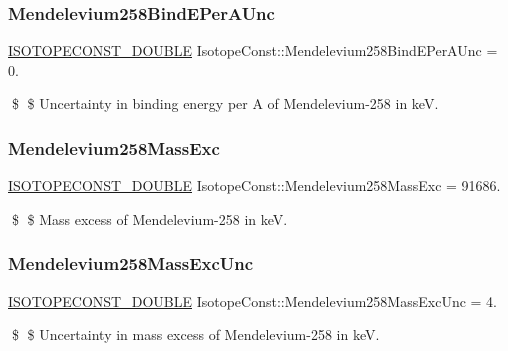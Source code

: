 \subsubsection{\texorpdfstring{Mendelevium258\+Bind\+E\+Per\+A\+Unc}{Mendelevium258BindEPerAUnc}}
{\footnotesize\ttfamily \mbox{\hyperlink{group___isotope_const-_macros_ga8f45a7272ce02c0b4c65c44636ed719a}{I\+S\+O\+T\+O\+P\+E\+C\+O\+N\+S\+T\+\_\+\+D\+O\+U\+B\+LE}} Isotope\+Const\+::\+Mendelevium258\+Bind\+E\+Per\+A\+Unc = 0.}

\$ \$ Uncertainty in binding energy per A of Mendelevium-\/258 in keV. \mbox{\label{group___isotope_const-_mendelevium-_md258_ga3d5959d3ce3120ada207ac061bf05345}} 
\subsubsection{\texorpdfstring{Mendelevium258\+Mass\+Exc}{Mendelevium258MassExc}}
{\footnotesize\ttfamily \mbox{\hyperlink{group___isotope_const-_macros_ga8f45a7272ce02c0b4c65c44636ed719a}{I\+S\+O\+T\+O\+P\+E\+C\+O\+N\+S\+T\+\_\+\+D\+O\+U\+B\+LE}} Isotope\+Const\+::\+Mendelevium258\+Mass\+Exc = 91686.}

\$ \$ Mass excess of Mendelevium-\/258 in keV. \mbox{\label{group___isotope_const-_mendelevium-_md258_ga4b67fa20a17feae10a77136f05ef73a9}} 
\subsubsection{\texorpdfstring{Mendelevium258\+Mass\+Exc\+Unc}{Mendelevium258MassExcUnc}}
{\footnotesize\ttfamily \mbox{\hyperlink{group___isotope_const-_macros_ga8f45a7272ce02c0b4c65c44636ed719a}{I\+S\+O\+T\+O\+P\+E\+C\+O\+N\+S\+T\+\_\+\+D\+O\+U\+B\+LE}} Isotope\+Const\+::\+Mendelevium258\+Mass\+Exc\+Unc = 4.}

\$ \$ Uncertainty in mass excess of Mendelevium-\/258 in keV. \mbox{\label{group___isotope_const-_mendelevium-_md258_gadb660aae15862812a437a35297cd8210}} 
